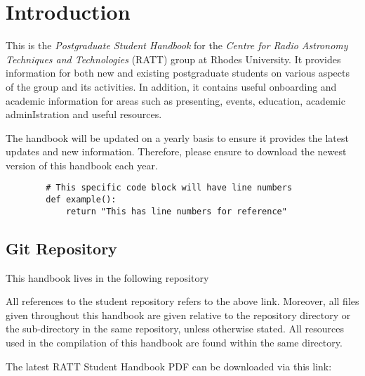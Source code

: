 \section{Introduction}

    This is the \emph{Postgraduate Student Handbook} for the \emph{Centre for Radio Astronomy Techniques and Technologies} (RATT) group at Rhodes University. It provides information for both new and existing postgraduate students on various aspects of the group and its activities. In addition, it contains useful onboarding and academic information for areas such as presenting, events, education, academic adminIstration and useful resources.

    The handbook will be updated on a yearly basis to ensure it provides the latest updates and new information. Therefore, please ensure to download the newest version of this handbook each year.


    \begin{verbatim}
        # This specific code block will have line numbers
        def example():
            return "This has line numbers for reference"
    \end{verbatim}

    \subsection{Git Repository}\label{subsec:git_repository}
        This handbook lives in the following repository

        \begin{quotation}
        \end{quotation}

        All references to the student repository refers to the above link. Moreover, all files given throughout this handbook are given relative to the repository directory  or the sub-directory  in the same repository, unless otherwise stated. All resources used in the compilation of this handbook are found within the same directory.

        The latest RATT Student Handbook PDF can be downloaded via this link:

